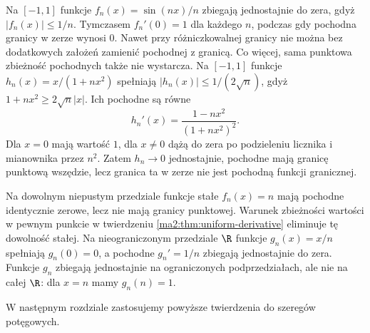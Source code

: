 \begin{przyklad}
\label{ma2:ex:derivative-mismatch}
Na $[-1,1]$ funkcje $f_n(x)=\sin(nx)/n$
zbiegają jednostajnie do zera, gdyż
$|f_n(x)|\le1/n$. Tymczasem $f_n'(0)=1$
dla każdego $n$, podczas gdy pochodna granicy
w zerze wynosi $0$. Nawet przy różniczkowalnej
granicy nie można bez dodatkowych założeń
zamienić pochodnej z granicą.
Co więcej, sama punktowa zbieżność pochodnych
także nie wystarcza. Na $[-1,1]$ funkcje
$h_n(x)=x/(1+nx^2)$ spełniają
$|h_n(x)|\le 1/(2\sqrt n)$, gdyż
$1+nx^2\ge 2\sqrt n|x|$.
Ich pochodne są równe
\[
 h_n'(x)=\frac{1-nx^2}{(1+nx^2)^2}.
\]
Dla $x=0$ mają wartość $1$, dla $x\ne0$
dążą do zera po podzieleniu licznika
i mianownika przez $n^2$.
Zatem $h_n\to0$ jednostajnie, pochodne
mają granicę punktową wszędzie, lecz
granica ta w zerze nie jest pochodną
funkcji granicznej.
\end{przyklad}

\begin{przyklad}
\label{ma2:ex:derivative-anchor}
Na dowolnym niepustym przedziale funkcje stałe
$f_n(x)=n$ mają pochodne identycznie zerowe,
lecz nie mają granicy punktowej. Warunek
zbieżności wartości w pewnym punkcie
w twierdzeniu \ref{ma2:thm:uniform-derivative}
eliminuje tę dowolność stałej.
Na nieograniczonym przedziale $\R$ funkcje
$g_n(x)=x/n$ spełniają $g_n(0)=0$,
a pochodne $g_n'=1/n$ zbiegają jednostajnie
do zera. Funkcje $g_n$ zbiegają jednostajnie
na ograniczonych podprzedziałach, ale nie
na całej $\R$: dla $x=n$ mamy $g_n(n)=1$.
\end{przyklad}

W następnym rozdziale zastosujemy powyższe
twierdzenia do szeregów potęgowych.

